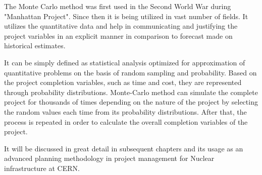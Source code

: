 The Monte Carlo method was first used in the Second World War during "Manhattan Project". Since then it is being utilized in vast number of fields. It utilizes the quantitative data and help in communicating and justifying the project variables in an explicit manner in comparison to forecast made on historical estimates.

It can be simply defined as statistical analysis optimized for approximation of quantitative problems on the basis of random sampling and probability. Based on the project completion variables, such as time and cost, they are represented through probability distributions. Monte-Carlo method can simulate the complete project for thousands of times depending on the nature of the project by selecting the random values each time from its probability distributions. After that, the process is repeated in order to calculate the overall completion variables of the project.

It will be discussed in great detail in subsequent chapters and its usage as an advanced planning methodology in project management for Nuclear infrastructure at  CERN.

